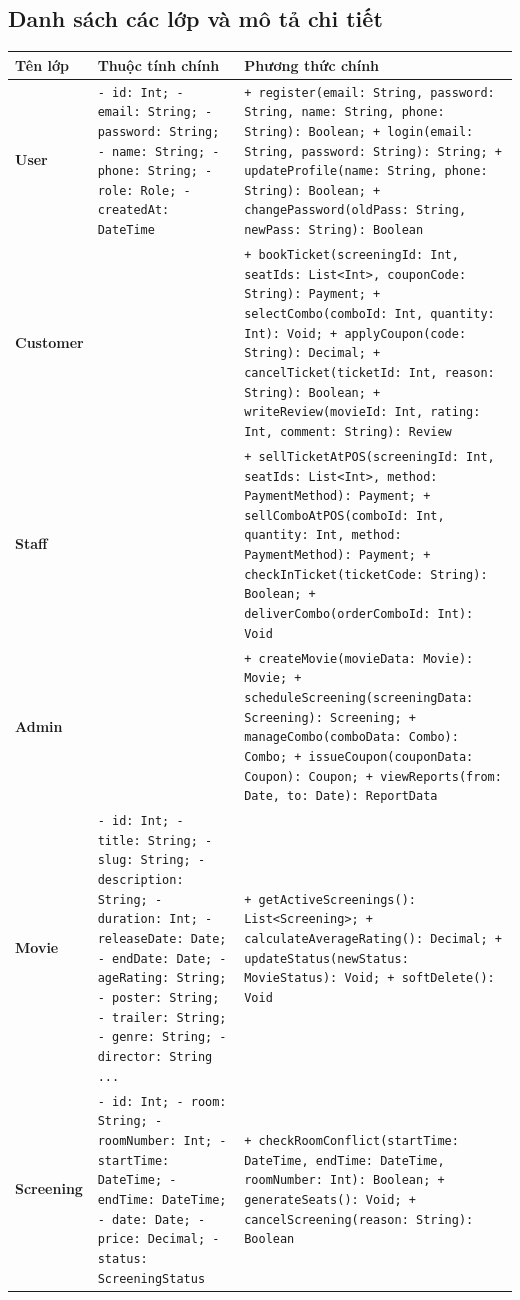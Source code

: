 \subsection{Danh sách các lớp và mô tả chi tiết}
\begin{longtable}{|p{3.2cm}|p{6.2cm}|p{6.1cm}|}
\hline
\rowcolor{headerblue} \textbf{Tên lớp} & \textbf{Thuộc tính chính} & \textbf{Phương thức chính} \\ \hline
\endhead
\textbf{User} & \texttt{\small - id: Int; - email: String; - password: String; - name: String; - phone: String; - role: Role; - createdAt: DateTime} & \texttt{\small + register(email: String, password: String, name: String, phone: String): Boolean; + login(email: String, password: String): String; + updateProfile(name: String, phone: String): Boolean; + changePassword(oldPass: String, newPass: String): Boolean} \\ \hline
\textbf{Customer} & \texttt{\small } & \texttt{\small + bookTicket(screeningId: Int, seatIds: List<Int>, couponCode: String): Payment; + selectCombo(comboId: Int, quantity: Int): Void; + applyCoupon(code: String): Decimal; + cancelTicket(ticketId: Int, reason: String): Boolean; + writeReview(movieId: Int, rating: Int, comment: String): Review} \\ \hline
\textbf{Staff} & \texttt{\small } & \texttt{\small + sellTicketAtPOS(screeningId: Int, seatIds: List<Int>, method: PaymentMethod): Payment; + sellComboAtPOS(comboId: Int, quantity: Int, method: PaymentMethod): Payment; + checkInTicket(ticketCode: String): Boolean; + deliverCombo(orderComboId: Int): Void} \\ \hline
\textbf{Admin} & \texttt{\small } & \texttt{\small + createMovie(movieData: Movie): Movie; + scheduleScreening(screeningData: Screening): Screening; + manageCombo(comboData: Combo): Combo; + issueCoupon(couponData: Coupon): Coupon; + viewReports(from: Date, to: Date): ReportData} \\ \hline
\textbf{Movie} & \texttt{\small - id: Int; - title: String; - slug: String; - description: String; - duration: Int; - releaseDate: Date; - endDate: Date; - ageRating: String; - poster: String; - trailer: String; - genre: String; - director: String ...} & \texttt{\small + getActiveScreenings(): List<Screening>; + calculateAverageRating(): Decimal; + updateStatus(newStatus: MovieStatus): Void; + softDelete(): Void} \\ \hline
\textbf{Screening} & \texttt{\small - id: Int; - room: String; - roomNumber: Int; - startTime: DateTime; - endTime: DateTime; - date: Date; - price: Decimal; - status: ScreeningStatus} & \texttt{\small + checkRoomConflict(startTime: DateTime, endTime: DateTime, roomNumber: Int): Boolean; + generateSeats(): Void; + cancelScreening(reason: String): Boolean} \\ \hline

\end{longtable}
